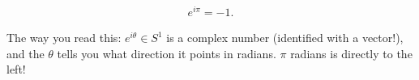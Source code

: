 \begin{proposition}

\begin{align*}
e^{i\pi} = -1
.\end{align*}

\end{proposition}

\begin{remark}

The way you read this: \(e^{i\theta} \in S^1\) is a complex number
(identified with a vector!), and the \(\theta\) tells you what direction
it points in radians. \(\pi\) radians is directly to the left!

\end{remark}

\cleardoublepage

\renewcommand{\listtheoremname}{}
\listoftheorems[ignoreall,show={definition}, numwidth=3.5em]
\cleardoublepage

\renewcommand{\listtheoremname}{}
\listoftheorems[ignoreall,show={theorem,proposition}, numwidth=3.5em]
\cleardoublepage

\renewcommand{\listtheoremname}{}
\listoftheorems[ignoreall,show={exercise}, numwidth=3.5em]
\cleardoublepage

\listoffigures
\cleardoublepage


\printbibliography[title=Bibliography]




